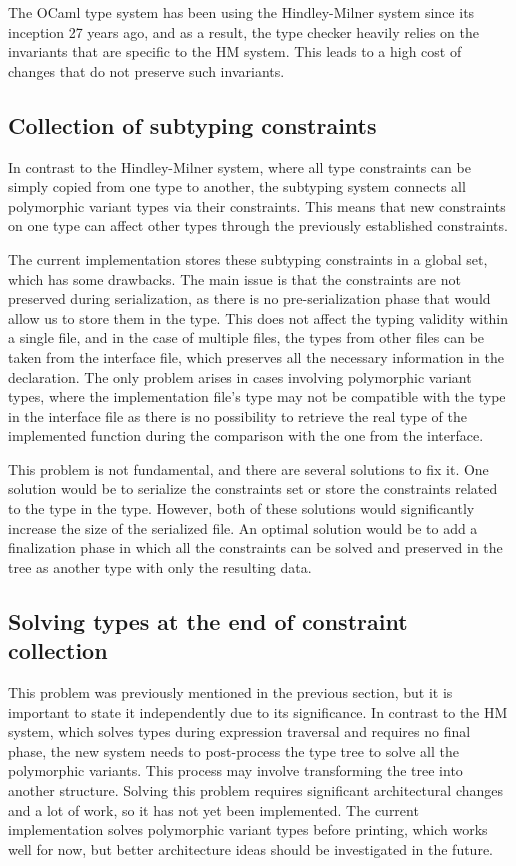 \documentclass[a4paper,11pt,oneside]{article}
\theoremstyle{definition}
\begin{document}
The OCaml type system has been using the Hindley-Milner system since its
inception 27 years ago, and as a result, the type checker heavily relies
on the invariants that are specific to the HM system. This leads to a high
cost of changes that do not preserve such invariants.

\subsection{Collection of subtyping constraints}

In contrast to the Hindley-Milner system, where all type constraints can
be simply copied from one type to another, the subtyping system connects
all polymorphic variant types via their constraints. This means that new
constraints on one type can affect other types through the previously
established constraints.

The current implementation stores these subtyping constraints in a global
set, which has some drawbacks. The main issue is that the constraints are
not preserved during serialization, as there is no pre-serialization phase
that would allow us to store them in the type. This does not affect the
typing validity within a single file, and in the case of multiple files,
the types from other files can be taken from the interface file, which
preserves all the necessary information in the declaration. The only problem
arises in cases involving polymorphic variant types, where the implementation
file's type may not be compatible with the type in the interface file as there
is no possibility to retrieve the real type of the implemented function during
the comparison with the one from the interface.

This problem is not fundamental, and there are several solutions to fix it.
One solution would be to serialize the constraints set or store the constraints
related to the type in the type. However, both of these solutions would
significantly increase the size of the serialized file. An optimal solution
would be to add a finalization phase in which all the constraints can be
solved and preserved in the tree as another type with only the resulting data.

\subsection{Solving types at the end of constraint collection}

This problem was previously mentioned in the previous section, but it is
important to state it independently due to its significance. In contrast
to the HM system, which solves types during expression traversal and
requires no final phase, the new system needs to post-process the type
tree to solve all the polymorphic variants. This process may involve
transforming the tree into another structure. Solving this problem requires
significant architectural changes and a lot of work, so it has not yet been
implemented. The current implementation solves polymorphic variant types
before printing, which works well for now, but better architecture ideas
should be investigated in the future.
\end{document}
